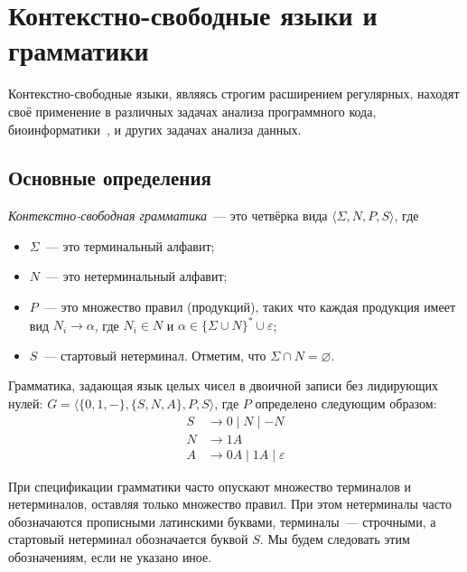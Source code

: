 \setchapterpreamble[u]{\margintoc}
\chapter{Контекстно-свободные языки и грамматики}
\label{CFG}

Контекстно-свободные языки, являясь строгим расширением регулярных, находят своё применение в различных задачах анализа программного кода, биоинформатики~\sidecite{!!!}, и других задачах анализа данных.

\section{Основные определения}

\begin{definition}
    \emph{Контекстно-свободная грамматика}~--- это четвёрка вида $\langle \Sigma, N, P, S \rangle$, где
    \begin{itemize}
        \item $\Sigma$~--- это терминальный алфавит;
        \item $N$~--- это нетерминальный алфавит;
        \item $P$~--- это множество правил (продукций), таких что каждая продукция имеет вид $N_i \to \alpha$, где $N_i \in N$ и $\alpha \in \{\Sigma \cup N\}^* \cup {\varepsilon}$;
        \item $S$~--- стартовый нетерминал.
              Отметим, что $\Sigma \cap N = \varnothing$.
    \end{itemize}
\end{definition}

\begin{example}
    \label{ex:binary_cfg}
    Грамматика, задающая язык целых чисел в двоичной записи без лидирующих нулей: $G = \langle \{0, 1, -\}, \{S, N, A\}, P, S \rangle$, где $P$ определено следующим образом:
    \begin{align*}
        S & \rightarrow 0 \mid N \mid - N              \\
        N & \rightarrow 1 A                            \\
        A & \rightarrow 0 A \mid 1 A  \mid \varepsilon
    \end{align*}
\end{example}

При спецификации грамматики часто опускают множество терминалов и нетерминалов, оставляя только множество правил.
При этом нетерминалы часто обозначаются прописными латинскими буквами, терминалы~--- строчными, а стартовый нетерминал обозначается буквой $S$.
Мы будем следовать этим обозначениям, если не указано иное.

